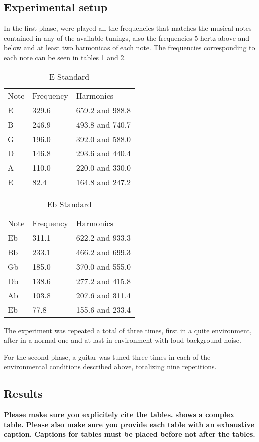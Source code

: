 \subsection{Experimental setup}
In the first phase, were played all the frequencies that matches the musical notes contained in any of the available tunings, also the frequencies 5 hertz above and below and at least two harmonicas of each note. The frequencies corresponding to each note can be seen in tables \ref{e_tuning} and \ref{eb_tuning}.

\begin{table}[]
\centering
\caption{E Standard}
\label{e_tuning}
\begin{tabular}{lll}
Note & Frequency & Harmonics       \\
E    & 329.6     & 659.2 and 988.8 \\
B    & 246.9     & 493.8 and 740.7 \\
G    & 196.0     & 392.0 and 588.0 \\
D    & 146.8     & 293.6 and 440.4 \\
A    & 110.0     & 220.0 and 330.0 \\
E    & 82.4      & 164.8 and 247.2
\end{tabular}
\end{table}

\begin{table}[]
\centering
\caption{Eb Standard}
\label{eb_tuning}
\begin{tabular}{lll}
Note & Frequency & Harmonics       \\
Eb   & 311.1     & 622.2 and 933.3 \\
Bb   & 233.1     & 466.2 and 699.3 \\
Gb   & 185.0     & 370.0 and 555.0 \\
Db   & 138.6     & 277.2 and 415.8 \\
Ab   & 103.8     & 207.6 and 311.4 \\
Eb   & 77.8      & 155.6 and 233.4
\end{tabular}
\end{table}

The experiment was repeated a total of three times, first in a quite environment, after in a normal one and at last in environment with loud background noise.

For the second phase, a guitar was tuned three times in each of the environmental conditions described above, totalizing nine repetitions.
\subsection{Results}
\textbf{Please make sure you explicitely cite the tables.
 shows a complex table.
Please also make sure you provide each table with an exhaustive caption.
Captions for tables must be placed before not after the tables.}
\lipsum[1-4]


